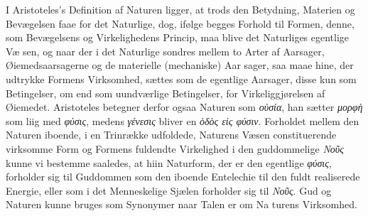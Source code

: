 \documentclass[12pt,a4paper]{book}
\newcommand{\gk}[1]{\textit{#1}}
\begin{document}
I Aristoteles's Definition af Naturen ligger, at trods den
Betydning, Materien og Bevægelsen faae for det Naturlige, dog,
ifølge begges Forhold til Formen, denne, som Bevægelsens og
Virkelighedens Princip, maa blive det Naturliges egentlige Væ\-%
sen, og naar der i det Naturlige sondres mellem to Arter af
Aarsager, Øiemedsaarsagerne og de materielle (mechaniske) Aar\-%
sager, saa maae hine, der udtrykke Formens Virksomhed, sættes
som de egentlige Aarsager, disse kun som Betingelser, om end
som uundværlige Betingelser, for Virkeliggjørelsen af Øiemedet.
Aristoteles betegner derfor ogsaa Naturen som \gk{οὐσία}, han
sætter \gk{μορφὴ} som liig med \gk{φύσις}, medens \gk{γένεσις} bliver en
\gk{ὁδὸς εἰς φύσιν}. Forholdet mellem den Naturen iboende, i en
Trinrække udfoldede, Naturens Væsen constituerende virksomme
Form og Formens fuldendte Virkelighed i den guddommelige
\gk{Νοῦς} kunne vi bestemme saaledes, at hiin Naturform, der er
den egentlige \gk{φύσις}, forholder sig til Guddommen som den
iboende Entelechie til den fuldt realiserede Energie, eller som i
det Menneskelige Sjælen forholder sig til \gk{Νοῦς}. Gud og
Naturen kunne bruges som Synonymer naar Talen er om Na\-%
turens Virksomhed.
\end{document}
